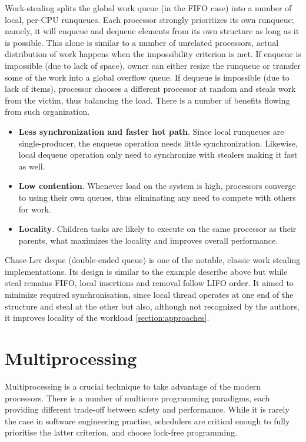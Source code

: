 \documentclass[12pt,a4paper,twoside]{report}
\begin{document}
Work-stealing splits the global work queue (in the FIFO case) into a number of local, per-CPU runqueues. Each processor strongly prioritizes its own runqueue; namely, it will enqueue and dequeue elements from its own structure as long as it is possible. This alone is similar to a number of unrelated processors, actual distribution of work happens when the impossibility criterion is met. If enqueue is impossible (due to lack of space), owner can either resize the runqueue or transfer some of the work into a global overflow queue. If dequeue is impossible (due to lack of items), processor chooses a different processor at random and steals work from the victim, thus balancing the load. There is a number of benefits flowing from such organization. \begin{itemize}
    \item \textbf{Less synchronization and faster hot path}. Since local runqueues are single-producer, the enqueue operation needs little synchronization. Likewise, local dequeue operation only need to synchronize with stealers making it fast as well. 
    \item \textbf{Low contention}. Whenever load on the system is high, processors converge to using their own queues, thus eliminating any need to compete with others for work.
    \item \textbf{Locality}. Children tasks are likely to execute on the same processor as their parents, what maximizes the locality and improves overall performance.
\end{itemize}

\label{paragraph:deque}
Chase-Lev deque (double-ended queue) \cite{Chase2005} is one of the notable, classic work stealing implementations. Its design is similar to the example describe above but while steal remains FIFO, local insertions and removal follow LIFO order. It aimed to minimize required synchronisation, since local thread operates at one end of the structure and steal at the other but also, although not recognized by the authors, it improves locality of the workload \ref{section:approaches}. 

\section{Multiprocessing}
\label{section:background_multiprocessing}

Multiprocessing is a crucial technique to take advantage of the modern processors. There is a number of multicore programming paradigms, each providing different trade-off between safety and performance. While it is rarely the case in software engineering practise, schedulers are critical enough to fully prioritise the latter criterion, and choose lock-free programming. 
\end{document}
